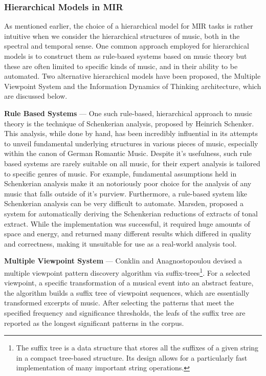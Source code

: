 \documentclass[../main.tex]{subfiles}
\begin{document}
\subsubsection{Hierarchical Models in MIR}

As mentioned earlier, the choice of a hierarchical model for MIR tasks is rather intuitive when we consider the hierarchical structures of music, both in the spectral and temporal sense. One common approach employed for hierarchical models is to construct them as rule-based systems based on music theory but these are often limited to specific kinds of music, and in their ability to be automated. Two alternative hierarchical models have been proposed, the Multiple Viewpoint System and the Information Dynamics of Thinking architecture, which are discussed below. 

\textbf{Rule Based Systems} — One such rule-based, hierarchical approach to music theory is the technique of Schenkerian analysis, proposed by Heinrich Schenker. \cite{Schenker} This analysis, while done by hand, has been incredibly influential in its attempts to unveil fundamental underlying structures in various pieces of music, especially within the canon of German Romantic Music. Despite it's usefulness, such rule based systems are rarely suitable on all music, for their expert analysis is tailored to specific genres of music. For example, fundamental assumptions held in Schenkerian analysis make it an notoriously poor choice for the analysis of any music that falls outside of it's purview. Furthermore, a rule-based system like Schenkerian analysis can be very difficult to automate. Marsden, \cite{Marsden:1} proposed a system for automatically deriving the Schenkerian reductions of extracts of tonal extract. While the implementation was successful, it required huge amounts of space and energy, and returned many different results which differed in quality and correctness, making it unsuitable for use as a real-world analysis tool.

\textbf{Multiple Viewpoint System} — Conklin and Anagnostopoulou \cite{Conklin:2} devised a multiple viewpoint pattern discovery algorithm via suffix-trees\footnote[2]{The suffix tree is a data structure that stores all the suffixes of a given string in a compact tree-based structure. Its design allows for a particularly fast implementation of many important string operations.}. For a selected viewpoint, a specific transformation of a musical event into an abstract feature, the algorithm builds a suffix tree of viewpoint sequences, which are essentially transformed excerpts of music. After selecting the patterns that meet the specified frequency and significance thresholds, the leafs of the suffix tree are reported as the longest significant patterns in the corpus. 
\end{document}
